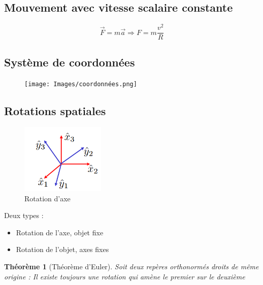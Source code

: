 \documentclass{article}
\newtheorem{theorem}{Théorème}[section]
\begin{document}
\subsection{Mouvement avec vitesse scalaire constante}
\[ \overrightarrow{F} = m\overrightarrow{a} \Rightarrow F = m\frac{v^2}{R} \] \newpage
\subsection{Système de coordonnées}
\begin{figure}[htp]
    \centering
    \texttt{[image: Images/coordonnées.png]}
    \label{fig:coord}
\end{figure}

\subsection{Rotations spatiales}
\begin{figure}[htp]
    \centering
    \includegraphics[width = 4cm]{Images/Rotation.png}
    \caption{Rotation d'axe}
    \label{fig:rotation}
\end{figure}
Deux types :
\begin{itemize}
    \item Rotation de l'axe, objet fixe
    \item Rotation de l'objet, axes fixes 
\end{itemize}
\begin{theorem}[Théorème d'Euler]
    Soit deux repères orthonormés droits de même origine : Il existe toujours une rotation qui amène le premier sur le deuxième
\end{theorem} \newpage
\end{document}
